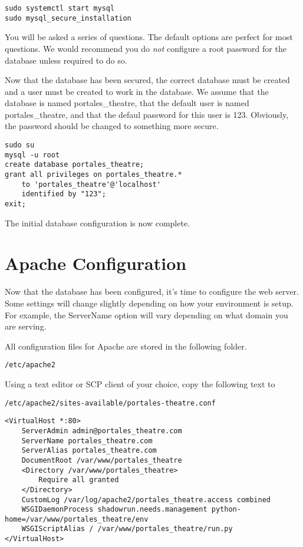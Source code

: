 \begin{verbatim}
sudo systemctl start mysql
sudo mysql_secure_installation
\end{verbatim}

You will be asked a series of questions. The default options are perfect for most questions. We would recommend you do \textit{not} configure a root password for the database unless required to do so.

Now that the database has been secured, the correct database must be created and a user must be created to work in the database. We assume that the database is named portales\_theatre, that the default user is named portales\_theatre, and that the defaul password for this user is 123. Obviously, the password should be changed to something more secure.

\begin{verbatim}
sudo su
mysql -u root
create database portales_theatre;
grant all privileges on portales_theatre.*
    to 'portales_theatre'@'localhost'
    identified by "123";
exit;
\end{verbatim}

The initial database configuration is now complete.

\section{Apache Configuration} \label{webserver_configuration}

Now that the database has been configured, it's time to configure the web server. Some settings will change slightly depending on how your environment is setup. For example, the ServerName option will vary depending on what domain you are serving.

All configuration files for Apache are stored in the following folder.
\begin{verbatim}
/etc/apache2
\end{verbatim}

Using a text editor or SCP client of your choice, copy the following text to

\begin{verbatim}
/etc/apache2/sites-available/portales-theatre.conf
\end{verbatim}

\begin{verbatim}
<VirtualHost *:80>
    ServerAdmin admin@portales_theatre.com
    ServerName portales_theatre.com
    ServerAlias portales_theatre.com
    DocumentRoot /var/www/portales_theatre
    <Directory /var/www/portales_theatre>
        Require all granted
    </Directory>
    CustomLog /var/log/apache2/portales_theatre.access combined
    WSGIDaemonProcess shadowrun.needs.management python-home=/var/www/portales_theatre/env
    WSGIScriptAlias / /var/www/portales_theatre/run.py
</VirtualHost>
\end{verbatim}

